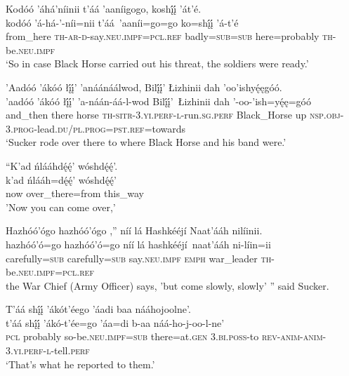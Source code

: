 \ea\label{ex:text1-58-9}
Kodóó ’áhá’níinii t’áá ’aaníigogo, koshį́į́ ’át’é.\\
\gll kodóó	’á-há-’-níi=nii	t’áá~{’aaníi=go=go}	ko=shį́į́	’á-t’é\\
     from\_here	\textsc{th}-\textsc{ar}-\textsc{d}-say.\textsc{neu}.\textsc{impf}=\textsc{pcl}.\textsc{ref}	badly=\textsc{sub}=\textsc{sub}	here=probably	\textsc{th}-be.\textsc{neu}.\textsc{impf}\\
\glt `So in case Black Horse carried out his threat, the soldiers were ready.'
\z

\ea\label{ex:text1-59}
’Aadóó ’ákóó łį́į́’ ’anáánáálwod, Bilį́į́’ Łizhinii dah ’oo’ishyę́ęgóó.\\
\gll ’aadóó	’ákóó	łį́į́’	’a-náán-áá-l-wod	Bilį́į́’~{Łizhinii}	dah	’-oo-’ish=yę́ę=góó\\
     and\_then	there	horse	\textsc{th}-\textsc{sitr}-3.\textsc{yi}.\textsc{perf}-\textsc{l}-run.\textsc{sg}.\textsc{perf}	Black\_Horse	up	\textsc{nsp}.\textsc{obj}-3.\textsc{prog}-lead.\textsc{du}/\textsc{pl}.\textsc{prog}=\textsc{pst}.\textsc{ref}=towards\\
\glt `Sucker rode over there to where Black Horse and his band were.'
\z

\ea\label{ex:text1-60-1}
``K’ad ńlááhdę́ę́’ wóshdę́ę́’.\\
\gll k’ad	ńlááh=dę́ę́’	wóshdę́ę́’\\
     now	over\_there=from	this\_way\\
\glt 'Now you can come over,'
\z

\ea\label{ex:text1-60-2}
Hazhóó’ógo hazhóó’ógo ,'' níí lá Hashkééjí Naat’ááh nilíinii.\\
\gll hazhóó’ó=go	hazhóó’ó=go	níí	lá	hashkééjí~{naat’ááh}	ni-líin=ii\\
     carefully=\textsc{sub}	carefully=\textsc{sub}	say.\textsc{neu}.\textsc{impf}	\textsc{emph}	war\_leader	\textsc{th}-be.\textsc{neu}.\textsc{impf}=\textsc{pcl}.\textsc{ref}\\
\glt the War Chief (Army Officer) says, 'but come slowly, slowly' '' said Sucker.
\z

\ea\label{ex:text1-61-1}
T’áá shį́į́ ’ákót’éego ’áadi baa nááhojoolne’.\\
\gll t’áá	shį́į́	’ákó-t’ée=go	’áa=di	b-aa	náá-ho-j-oo-l-ne’\\
     \textsc{pcl}	probably	so-be.\textsc{neu}.\textsc{impf}=\textsc{sub}	there=at.\textsc{gen}	3.\textsc{bi}.\textsc{poss}-to	\textsc{rev}-\textsc{anim}-\textsc{anim}-3.\textsc{yi}.\textsc{perf}-\textsc{l}-tell.\textsc{perf}\\
\glt `That's what he reported to them.'
\z

